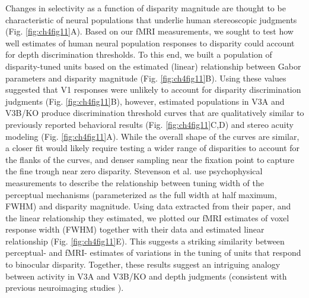 Changes in selectivity as a function of disparity magnitude are thought to be characteristic of neural populations that underlie human stereoscopic judgments \cite{Lehky:1990fk, Stevenson:1992kx} (Fig. \ref{fig:ch4fig11}A). Based on our fMRI measurements, we sought to test how well estimates of human neural population responses to disparity could account for depth discrimination thresholds. To this end, we built a population of disparity-tuned units based on the estimated (linear) relationship between Gabor parameters and disparity magnitude (Fig. \ref{fig:ch4fig11}B). Using these values suggested that V1 responses were unlikely to account for disparity discrimination judgments (Fig. \ref{fig:ch4fig11}B), however, estimated populations in V3A and V3B/KO produce discrimination threshold curves that are qualitatively similar to previously reported behavioral results \cite{Badcock:1985ly} (Fig. \ref{fig:ch4fig11}C,D) and stereo acuity modeling \cite{Lehky:1990fk} (Fig. \ref{fig:ch4fig11}A). While the overall shape of the curves are similar, a closer fit would likely require testing a wider range of disparities to account for the flanks of the curves, and denser sampling near the fixation point to capture the fine trough near zero disparity. Stevenson et al. \cite{Stevenson:1992kx} use psychophysical measurements to describe the relationship between tuning width of the perceptual mechanisms (parameterized as the full width at half maximum, FWHM) and disparity magnitude. Using data extracted from their paper, and the linear relationship they estimated, we plotted our fMRI estimates of voxel response width (FWHM) together with their data and estimated linear relationship (Fig. \ref{fig:ch4fig11}E). This suggests a striking similarity between perceptual- and fMRI- estimates of variations in the tuning of units that respond to binocular disparity. Together, these results suggest an intriguing analogy between activity in V3A and V3B/KO and depth judgments (consistent with previous neuroimaging studies \cite{Preston:2008dg,Ban:2012jr,Murphy:2013ys,Dovencioglu:2013zr}). 

